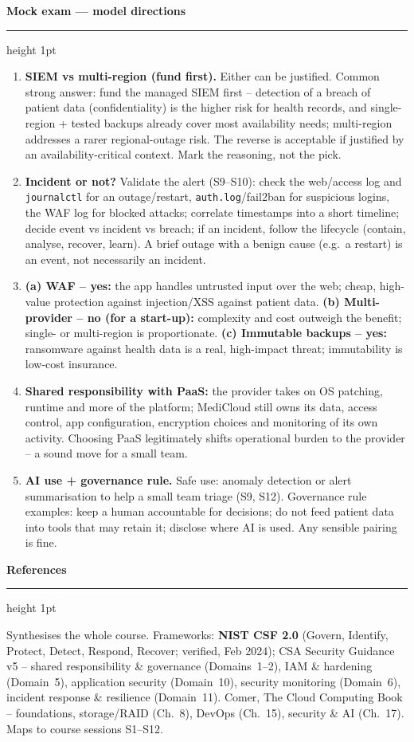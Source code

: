 \documentclass[11pt]{article}
\newcommand{\wbsection}[1]{\par\vspace{11pt}\noindent
  {\large\bfseries\color{kred}#1}\par\vspace{2pt}
  {\color{kred!35}\hrule height 1pt}\par\vspace{6pt}}
\renewcommand{\emph}[1]{\textup{#1}}
\newcommand{\cmd}[1]{\texttt{#1}}
\begin{document}
\wbsection{Mock exam --- model directions}
\begin{enumerate}
\item \textbf{SIEM vs multi-region (fund first).} Either can be justified. Common strong answer: fund the
      \emph{managed SIEM} first -- detection of a breach of patient data (confidentiality) is the higher
      risk for health records, and single-region + tested backups already cover most availability needs;
      multi-region addresses a rarer regional-outage risk. The reverse is acceptable \emph{if} justified
      by an availability-critical context. Mark the reasoning, not the pick.
\item \textbf{Incident or not?} Validate the alert (S9--S10): check the web/access log and
      \cmd{journalctl} for an outage/restart, \cmd{auth.log}/fail2ban for suspicious logins, the WAF log
      for blocked attacks; correlate timestamps into a short timeline; decide event vs incident vs breach;
      if an incident, follow the lifecycle (contain, analyse, recover, learn). A brief outage with a
      benign cause (e.g.\ a restart) is an \emph{event}, not necessarily an incident.
\item \textbf{(a) WAF -- yes:} the app handles untrusted input over the web; cheap, high-value protection
      against injection/XSS against patient data. \textbf{(b) Multi-provider -- no (for a start-up):}
      complexity and cost outweigh the benefit; single- or multi-region is proportionate. \textbf{(c)
      Immutable backups -- yes:} ransomware against health data is a real, high-impact threat; immutability
      is low-cost insurance.
\item \textbf{Shared responsibility with PaaS:} the provider takes on OS patching, runtime and more of the
      platform; MediCloud still owns its data, access control, app configuration, encryption choices and
      monitoring of its own activity. Choosing PaaS legitimately shifts operational burden to the provider
      -- a sound move for a small team.
\item \textbf{AI use + governance rule.} Safe use: anomaly detection or alert summarisation to help a small
      team triage (S9, S12). Governance rule examples: keep a human accountable for decisions; do not feed
      patient data into tools that may retain it; disclose where AI is used. Any sensible pairing is fine.
\end{enumerate}

\wbsection{References}
Synthesises the whole course. Frameworks: \textbf{NIST CSF 2.0} (Govern, Identify, Protect, Detect,
Respond, Recover; verified, Feb 2024); CSA Security Guidance v5 -- shared responsibility \& governance
(Domains~1--2), IAM \& hardening (Domain~5), application security (Domain~10), security monitoring
(Domain~6), incident response \& resilience (Domain~11). Comer, \emph{The Cloud Computing Book} --
foundations, storage/RAID (Ch.~8), DevOps (Ch.~15), security \& AI (Ch.~17). Maps to course sessions
S1--S12.
\end{document}
